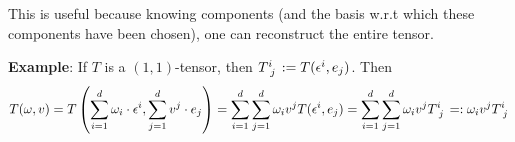 This is useful because knowing components (and the basis w.r.t which these components have been chosen), one can reconstruct the entire tensor.

\textbf{Example}: If $T$ is a $(1,1)$-tensor, then $T\indices{^{i}_{j}} := T(\epsilon^i,e_j)$. Then\\
\begin{equation*}
T(\omega,v) = T\left(\sum_{i=1}^d \omega_i \cdot \epsilon^i,\sum_{j=1}^d v^j \cdot e_j \right) = \sum_{i=1}^d \sum_{j=1}^d \omega_i v^j T(\epsilon^i,e_j) = \sum_{i=1}^d \sum_{j=1}^d \omega_i v^j T\indices{^{i}_{j}} =: \omega_i v^j T\indices{^{i}_{j}}
\end{equation*}
